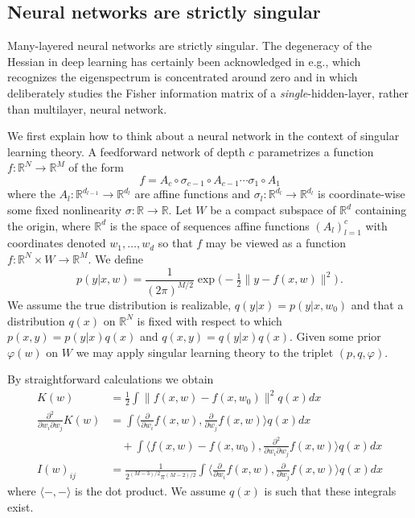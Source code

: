 \documentclass{article} %
\def\lto{\longrightarrow}
\begin{document}
\subsection{Neural networks are strictly singular}
\label{appendix:nn_singular}
Many-layered neural networks are strictly singular. The degeneracy of the Hessian in deep learning has certainly been acknowledged in e.g., \citet{DBLP:journals/corr/SagunBL16} which recognizes the eigenspectrum is concentrated around zero and in \citet{pennington_spectrum_2018} which deliberately studies the Fisher information matrix of a \textit{single}-hidden-layer, rather than multilayer, neural network. 

We first explain how to think about a neural network in the context of singular learning theory. A feedforward network of depth $c$ parametrizes a function $f: \mathbb{R}^N \lto \mathbb{R}^M$ of the form
\[
f = A_c \circ \sigma_{c-1} \circ A_{c-1} \cdots \sigma_1 \circ A_1
\]
where the $A_l: \mathbb{R}^{d_{l-1}} \lto \mathbb{R}^{d_{l}}$ are affine functions and $\sigma_l: \mathbb{R}^{d_{l}} \lto \mathbb{R}^{d_{l}}$ is coordinate-wise some fixed nonlinearity $\sigma: \mathbb{R} \lto \mathbb{R}$. Let $W$ be a compact subspace of $\mathbb{R}^d$ containing the origin, where $\mathbb{R}^d$ is the space of sequences affine functions $(A_l)_{l=1}^c$ with coordinates denoted $w_1,\ldots,w_d$ so that $f$ may be viewed as a function $f: \mathbb{R}^N \times W \lto \mathbb{R}^M$. We define
\begin{equation}
p(y|x,w) = \frac{1}{(2 \pi)^{M/2}} \exp\Big(-\tfrac{1}{2} \| y - f(x,w) \|^2 \Big)\,.
\label{eq:gaussian_model_in_w}
\end{equation}
We assume the true distribution is realizable, $q(y|x) = p(y|x,w_0)$ and that a distribution $q(x)$ on $\mathbb{R}^N$ is fixed with respect to which $p(x,y) = p(y|x)q(x)$ and $q(x,y) = q(y|x)q(x)$. Given some prior $\varphi(w)$ on $W$ we may apply singular learning theory to the triplet $(p,q,\varphi)$.

By straightforward calculations we obtain
\begin{align}
K(w) &= \tfrac{1}{2} \int \| f(x,w) - f(x,w_0) \|^2 q(x) dx \label{eq:K_nn}\\
\tfrac{\partial^2}{\partial w_i \partial w_j} K(w) &= \int \Big\langle \tfrac{\partial}{\partial w_i} f(x,w), \tfrac{\partial}{\partial w_j} f(x,w) \Big\rangle q(x) dx \nonumber \\
&\quad + \int \Big\langle f(x,w) - f(x,w_0), \tfrac{\partial^2}{\partial w_i \partial w_j} f(x,w) \Big\rangle q(x) dx \label{eq:Hessian}\\
I(w)_{ij} &= \frac{1}{2^{(M-3)/2} \pi^{(M-2)/2}} \int \Big\langle \tfrac{\partial}{\partial w_i} f(x,w), \tfrac{\partial}{\partial w_j} f(x,w) \Big\rangle q(x) dx\label{eq:fisher_relu}
\end{align}
where $\langle -, - \rangle$ is the dot product. We assume $q(x)$ is such that these integrals exist.
\end{document}
